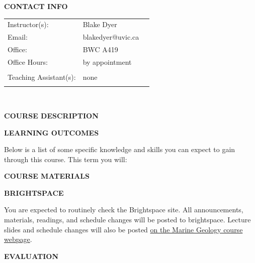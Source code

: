 \documentclass[11pt]{article}
\begin{document}
\textbf{CONTACT INFO}

\begin{center}
  \centering
  \begin{tabular}{ L{.25\linewidth}L{.25\linewidth}L{.0\linewidth} }
    Instructor(s):      & Blake Dyer &  \\
    Email:      & blakedyer@uvic.ca &  \\
    Office:      & BWC A419 &  \\
    Office Hours:      & by appointment &  \\
          &  &  \\
Teaching Assistant(s):      & none &  \\
      &  &  \\
  \end{tabular}\\
\end{center}

\begin{center}
\textbf{COURSE DESCRIPTION}
\end{center}


\clearpage

\textbf{LEARNING OUTCOMES}

Below is a list of some specific knowledge and skills you can expect to gain through this course. This term you will:
\begin{itemize}
	\setlength\itemsep{0em}
        {\item \learningoutcome}
\end{itemize}


\textbf{COURSE MATERIALS}



\textbf{BRIGHTSPACE}

You are expected to routinely check the Brightspace site. All announcements, materials, readings, and schedule changes will be posted to brightspace. Lecture slides and schedule changes will also be posted \href{https://eos-courses.readthedocs.io/en/latest/eos408-public/overview.html}{on the Marine Geology course webpage}.

\begin{center}
  \textbf{EVALUATION}
\end{center}
\end{document}
